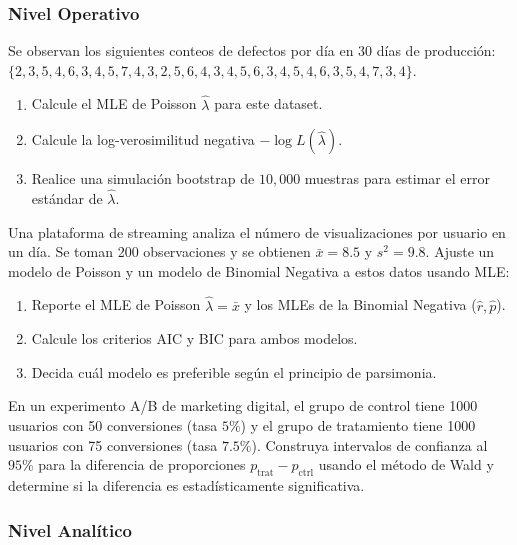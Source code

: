 \subsubsection*{Nivel Operativo}

\begin{problema}
	\label{prob:3.10.4}
	Se observan los siguientes conteos de defectos por día en 30 días de producción: $\{2, 3, 5, 4, 6, 3, 4, 5, 7, 4, 3, 2, 5, 6, 4, 3, 4, 5, 6, 3, 4, 5, 4, 6, 3, 5, 4, 7, 3, 4\}$.
	\begin{enumerate}
		\item Calcule el MLE de Poisson $\hat{\lambda}$ para este dataset.
		\item Calcule la log-verosimilitud negativa $-\log L(\hat{\lambda})$.
		\item Realice una simulación bootstrap de $10{,}000$ muestras para estimar el error estándar de $\hat{\lambda}$.
	\end{enumerate}
\end{problema}

\begin{problema}
	\label{prob:3.10.5}
	Una plataforma de streaming analiza el número de visualizaciones por usuario en un día. Se toman 200 observaciones y se obtienen $\bar{x} = 8.5$ y $s^{2} = 9.8$. Ajuste un modelo de Poisson y un modelo de Binomial Negativa a estos datos usando MLE:
	\begin{enumerate}
		\item Reporte el MLE de Poisson $\hat{\lambda} = \bar{x}$ y los MLEs de la Binomial Negativa ($\hat{r}, \hat{p}$).
		\item Calcule los criterios AIC y BIC para ambos modelos.
		\item Decida cuál modelo es preferible según el principio de parsimonia.
	\end{enumerate}
\end{problema}

\begin{problema}
	\label{prob:3.10.6}
	En un experimento A/B de marketing digital, el grupo de control tiene 1000 usuarios con 50 conversiones (tasa $5\%$) y el grupo de tratamiento tiene 1000 usuarios con 75 conversiones (tasa $7.5\%$). Construya intervalos de confianza al $95\%$ para la diferencia de proporciones $p_{\text{trat}} - p_{\text{ctrl}}$ usando el método de Wald y determine si la diferencia es estadísticamente significativa.
\end{problema}

\subsubsection*{Nivel Analítico}

